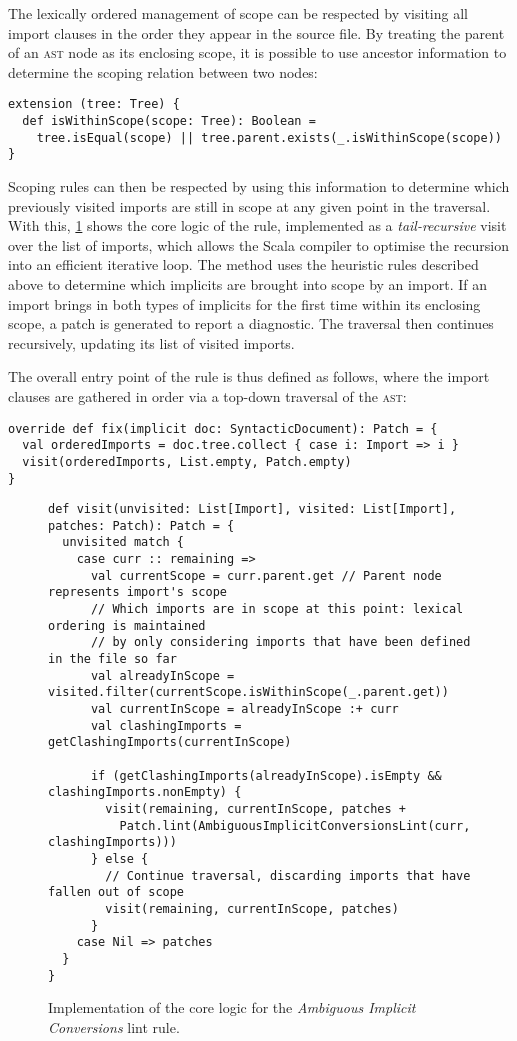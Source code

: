 \documentclass[../../main.tex]{subfiles}
\begin{document}
The lexically ordered management of scope can be respected by visiting all import clauses in the order they appear in the source file.
By treating the parent of an \textsc{ast} node as its enclosing scope, it is possible to use ancestor information to determine the scoping relation between two nodes:
\begin{verbatim}
extension (tree: Tree) {
  def isWithinScope(scope: Tree): Boolean =
    tree.isEqual(scope) || tree.parent.exists(_.isWithinScope(scope))
}
\end{verbatim}
%
Scoping rules can then be respected by using this information to determine which previously visited imports are still in scope at any given point in the traversal.
With this, \cref{fig:ambiguous-implicits-impl} shows the core logic of the rule, implemented as a \emph{tail-recursive} visit over the list of imports, which allows the Scala compiler to optimise the recursion into an efficient iterative loop.
The  method uses the heuristic rules described above to determine which implicits are brought into scope by an import.
If an import brings in both types of implicits for the first time within its enclosing scope, a patch is generated to report a diagnostic.
The traversal then continues recursively, updating its list of visited imports.

The overall entry point of the rule is thus defined as follows, where the import clauses are gathered in order via a top-down traversal of the \textsc{ast}:
\begin{verbatim}
override def fix(implicit doc: SyntacticDocument): Patch = {
  val orderedImports = doc.tree.collect { case i: Import => i }
  visit(orderedImports, List.empty, Patch.empty)
}
\end{verbatim}

\begin{figure}[htbp]
\begin{verbatim}
def visit(unvisited: List[Import], visited: List[Import], patches: Patch): Patch = {
  unvisited match {
    case curr :: remaining =>
      val currentScope = curr.parent.get // Parent node represents import's scope
      // Which imports are in scope at this point: lexical ordering is maintained
      // by only considering imports that have been defined in the file so far
      val alreadyInScope = visited.filter(currentScope.isWithinScope(_.parent.get))
      val currentInScope = alreadyInScope :+ curr
      val clashingImports = getClashingImports(currentInScope)

      if (getClashingImports(alreadyInScope).isEmpty && clashingImports.nonEmpty) {
        visit(remaining, currentInScope, patches +
          Patch.lint(AmbiguousImplicitConversionsLint(curr, clashingImports)))
      } else {
        // Continue traversal, discarding imports that have fallen out of scope
        visit(remaining, currentInScope, patches)
      }
    case Nil => patches
  }
}
\end{verbatim}
\caption{Implementation of the core logic for the \emph{Ambiguous Implicit Conversions} lint rule.}
\label{fig:ambiguous-implicits-impl}
\end{figure}
\end{document}
